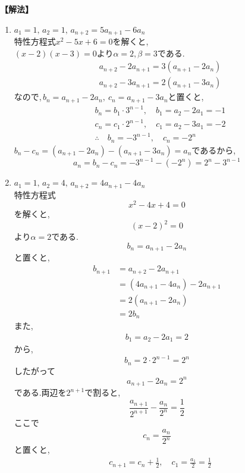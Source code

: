 \noindent\textbf{【解法】}
\begin{enumerate}[label=(\arabic*),parsep=3pt]
  \item $\displaystyle a_1=1,\,a_2=1,\, a_{n+2}=5a_{n+1}-6a_n$\\
        特性方程式$x^2-5x+6=0$を解くと,\\
        $(x-2)(x-3)=0$より$\alpha=2,\beta=3$である.
        \begin{align*}
           & a_{n+2}-2a_{n+1}=3(a_{n+1}-2a_n) \\
           & a_{n+2}-3a_{n+1}=2(a_{n+1}-3a_n)
        \end{align*}
        なので,\,$b_n=a_{n+1}-2a_n,\ c_n=a_{n+1}-3a_n$と置くと,
        \begin{align*}
           & b_n=b_1\cdot3^{n-1},\quad b_1=a_2-2a_1=-1    \\
           & c_n=c_1\cdot2^{n-1},\quad c_1=a_2-3a_1=-2    \\
           & \therefore \quad b_n=-3^{n-1},\quad c_n=-2^n
        \end{align*}
        $b_n-c_n=(a_{n+1}-2a_n)-(a_{n+1}-3a_n)=a_n$であるから,
        \[
          a_n=b_n-c_n=-3^{n-1}-(-2^n)=2^n-3^{n-1}
        \]
  \item $\displaystyle a_1=1,\,a_2=4,\, a_{n+2}=4a_{n+1}-4a_n$\\
        特性方程式
        \[
          x^2-4x+4=0
        \]
        を解くと,
        \[
          (x-2)^2=0
        \]
        より$\alpha=2$である.
        \[
          b_n=a_{n+1}-2a_n
        \]
        と置くと,
        \begin{align*}
          b_{n+1}&=a_{n+2}-2a_{n+1}\\
          &=(4a_{n+1}-4a_n)-2a_{n+1}\\
          &=2(a_{n+1}-2a_n)\\
          &=2b_n
        \end{align*}
        また,
        \begin{align*}
          b_1=a_2-2a_1=2
        \end{align*}
        から,
        \[
          b_n=2\cdot2^{n-1}=2^n
        \]
        したがって
        \[
          a_{n+1}-2a_n=2^n
        \]
        である.両辺を$2^{n+1}$で割ると,
        \[
          \frac{a_{n+1}}{2^{n+1}}-\frac{a_n}{2^n}=\frac12
        \]
        ここで
        \[
          c_n=\dfrac{a_n}{2^n}
        \]
        と置くと,
        \begin{align*}
          &c_{n+1}=c_n+\frac12,\quad c_1=\frac{a_1}{2}=\frac12\\

\end{align*}
\end{enumerate}

